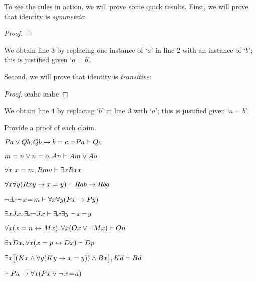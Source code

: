 To see the rules in action, we will prove some quick results. First, we will prove that identity is \emph{symmetric}:
\begin{proof}
	\open
	\close
\end{proof}
We obtain line 3 by replacing one instance of `$a$' in line 2 with an instance of `$b$'; this is justified given `$a= b$'. 

Second, we will prove that identity is \emph{transitive}:
\begin{proof}
	\open
		\ae{abc}
		\ae{abc}
	\close
\end{proof}
We obtain line 4 by replacing `$b$' in line 3 with `$a$'; this is justified given `$a= b$'. 

\practiceproblems
\problempart
\label{pr.identity}
Provide a proof of each claim.
\begin{earg}
\item $Pa \vee Qb, Qb \rightarrow b=c, \neg Pa \vdash Qc$
\item $m=n \vee n=o, An \vdash Am \vee Ao$
\item $\forall x\ x=m, Rma\vdash \exists x Rxx$
\item $\forall x\forall y(Rxy \rightarrow x=y)\vdash Rab \rightarrow Rba$
\item $\neg \exists x\neg\, x\!=\! m \vdash \forall x\forall y (Px \rightarrow Py)$
\item $\exists x Jx, \exists x \neg Jx\vdash \exists x \exists y\ \neg\, x\!=\! y$
\item $\forall x(x=n \leftrightarrow Mx), \forall x(Ox \vee \neg Mx)\vdash On$
\item $\exists x Dx, \forall x(x=p \leftrightarrow Dx)\vdash Dp$
\item $\exists x\bigl[(Kx \wedge \forall y(Ky \rightarrow x=y)) \wedge Bx\bigr], Kd\vdash Bd$
\item $\vdash Pa \rightarrow \forall x(Px \vee \neg\, x\!=\! a)$
\end{earg}

